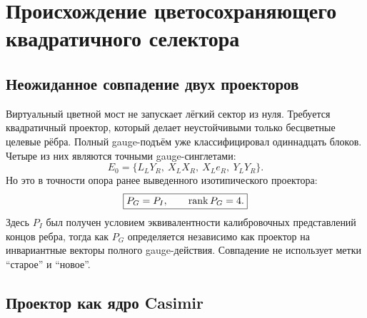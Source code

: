 \chapter{Происхождение цветосохраняющего квадратичного селектора}
\label{ch:v7-color-preserving-quadratic-selector-origin-gate}

\section{Неожиданное совпадение двух проекторов}

Виртуальный цветной мост не запускает лёгкий сектор из нуля. Требуется
квадратичный проектор, который делает неустойчивыми только бесцветные
целевые рёбра. Полный gauge-подъём уже классифицировал одиннадцать блоков.
Четыре из них являются точными gauge-синглетами:
\begin{equation}
 E_0=\{L_LY_R,\ X_LX_R,\ X_Le_R,\ Y_LY_R\}.
 \label{eq:v7-color-selector-singlet-support}
\end{equation}
Но это в точности опора ранее выведенного изотипического проектора:
\begin{equation}
 \boxed{P_G=P_I,\qquad \operatorname{rank} P_G=4.}
 \label{eq:v7-color-selector-projector-coincidence}
\end{equation}
Здесь $P_I$ был получен условием эквивалентности калибровочных
представлений концов ребра, тогда как $P_G$ определяется независимо как
проектор на инвариантные векторы полного gauge-действия. Совпадение не
использует метки ``старое'' и ``новое''.

\section{Проектор как ядро Casimir}

